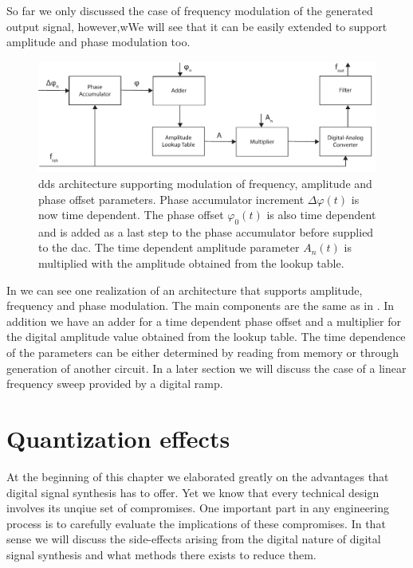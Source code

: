 So far we only discussed the case of frequency modulation of the generated
output signal, however,wWe will see that it can be easily extended to support
amplitude and phase modulation too.
\begin{figure}[htb]
  \centering
  \includegraphics[width=\textwidth]
  {../figure/digital-signal-synthesis/modulation-architecture.pdf}
  \caption{\gls{dds} architecture supporting modulation of frequency,
    amplitude and phase offset parameters. Phase accumulator increment
    $\Delta\varphi(t)$ is now time dependent. The phase offset $\varphi_0(t)$
    is also time dependent and is added as a last step to the phase
    accumulator before supplied to the \gls{dac}. The time dependent amplitude
    parameter $A_n(t)$ is multiplied with the amplitude obtained from the
    lookup table.
  }\label{fig:dds_modulation_architecture}
\end{figure}
In  we can see one realization of an
architecture that supports amplitude, frequency and phase modulation. The main
components are the same as in . In addition
we have an adder for a time dependent phase offset and a multiplier for the
digital amplitude value obtained from the lookup table. The time dependence
of the parameters can be either determined by reading from memory or through
generation of another circuit. In a later section we will discuss the case of
a linear frequency sweep provided by a digital ramp.

\section{Quantization effects}

At the beginning of this chapter we elaborated greatly on the advantages that
digital signal synthesis has to offer. Yet we know that every technical design
involves its unqiue set of compromises. One important part in any engineering
process is to carefully evaluate the implications of these compromises. In
that sense we will discuss the side-effects arising from the digital nature of
digital signal synthesis and what methods there exists to reduce them.

